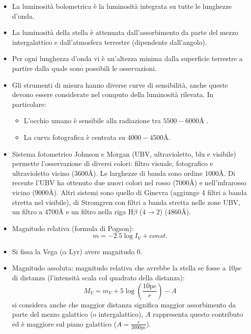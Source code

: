 \documentclass[11pt,a4paper]{article}
\begin{document}
\begin{itemize}

\item La luminosità bolometrica è la luminosità integrata su tutte le lunghezze d'onda.

\item La luminosità della stella è attenuata dall'assorbimento da parte del mezzo intergalattico e dall'atmosfera terrestre (dipendente dall'angolo).

\item Per ogni lunghezza d'onda vi è un'altezza minima dalla superficie terrestre a partire dalla quale sono possibili le osservazioni.

\item Gli strumenti di misura hanno diverse curve di sensibilità, anche queste devono essere considerate nel computo della luminosità rilevata. In particolare:
\begin{itemize}
\item L'occhio umano è sensibile alla radiazione tra $5500-6000 \si{\angstrom}$ .
\item La curva fotografica è centrata su $4000-4500 \si{\angstrom}$.
\end{itemize}

\item Sistema fotometrico Johnson e Morgan (UBV, ultravioletto, blu e visibile) permette l'osservazione di diversi colori: filtro visuale, fotografico e ultravioletto vicino ($3600 \si{\angstrom}$). Le larghezze di banda sono ordine $1000 \si{\angstrom}$. Di recente l'UBV ha ottenuto due nuovi colori nel rosso ($7000 \si{\angstrom}$) e nell'infrarosso vicino ($9000 \si{\angstrom}$).
Altri sistemi sono quello di  Ginevra (aggiunge 4 filtri a banda stretta nel visibile), di Stromgren con filtri a banda stretta nelle zone UBV, un filtro a $4700\si{\angstrom}$ e un filtro nella riga H$\beta$ ($4 \rightarrow 2$) ($4860 \si{\angstrom}$).

\item Magnitudo relativa (formula di Pogson):
\begin{equation}
m = -2.5 \log I_V + const.
\end{equation}

\item Si fissa la Vega ($\alpha$ Lyr) avere magnitudo $0$. 

\item Magnitudo assoluta: magnitudo relativa che avrebbe la stella se fosse a $10pc$ di distanza (l'intensità scala col quadrato della distanza):
\begin{equation}
M_{V} = m_{V} + 5 \log \left( \frac{10 \text{pc}}{r} \right) -A
\end{equation}
si considera anche che maggior distanza significa maggior assorbimento da parte del mezzo galattico (o intergalattico), $A$ rappresenta questo contributo ed è maggiore sul piano galattico ($A = \frac{r}{2000 \text{pc}})$.


\end{itemize}
\end{document}
